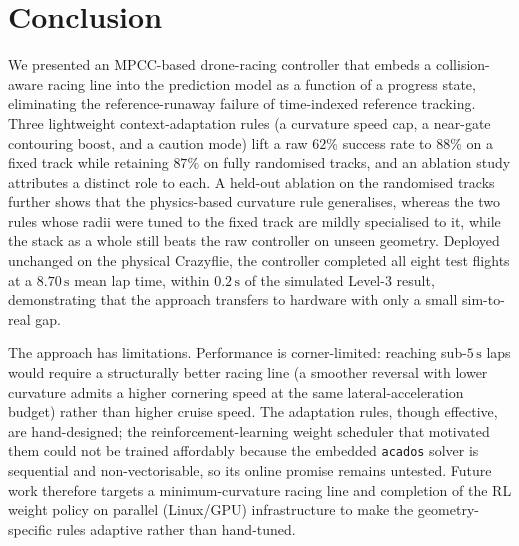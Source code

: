 \documentclass[conference]{IEEEtran}
\begin{document}
\section{Conclusion}
\label{sec:conclusion}
We presented an MPCC-based drone-racing controller that embeds a
collision-aware racing line into the prediction model as a function of a progress
state, eliminating the reference-runaway failure of time-indexed reference
tracking. Three lightweight context-adaptation rules (a curvature speed cap, a
near-gate contouring boost, and a caution mode) lift a raw $62\%$ success rate
to $88\%$ on a fixed track while retaining $87\%$ on fully randomised tracks, and
an ablation study attributes a distinct role to each. A held-out ablation on the
randomised tracks further shows that the physics-based curvature rule generalises,
whereas the two rules whose radii were tuned to the fixed track are mildly
specialised to it, while the stack as a whole still beats the raw controller on
unseen geometry. Deployed unchanged on the physical Crazyflie, the controller
completed all eight test flights at a $8.70\,\mathrm{s}$ mean lap time, within
$0.2\,\mathrm{s}$ of the simulated Level-3 result, demonstrating that the
approach transfers to hardware with only a small sim-to-real gap.

The approach has limitations. Performance is corner-limited: reaching
sub-$5\,\mathrm{s}$ laps would require a structurally better racing line (a
smoother reversal with lower curvature admits a higher cornering speed at the
same lateral-acceleration budget) rather than higher cruise speed. The
adaptation rules, though effective, are hand-designed; the reinforcement-learning
weight scheduler that motivated them could not be trained affordably because the
embedded \texttt{acados} solver is sequential and non-vectorisable, so its online
promise remains untested. Future work therefore targets a minimum-curvature
racing line and completion of the RL weight policy on parallel (Linux/GPU)
infrastructure to make the geometry-specific rules adaptive rather than
hand-tuned.




\end{document}
